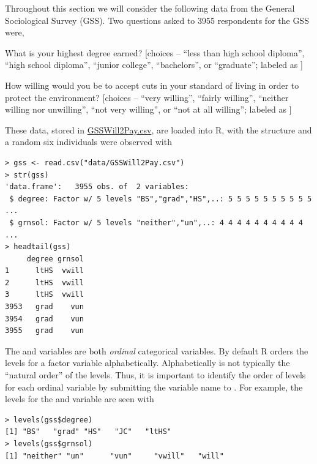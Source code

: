 \documentclass[10pt,openany]{book}\usepackage[]{graphicx}\usepackage[]{color}
\makeatletter
\newenvironment{kframe}{%
 \def\at@end@of@kframe{}%
 \ifinner\ifhmode%
  \def\at@end@of@kframe{\end{minipage}}%
  \begin{minipage}{\columnwidth}%
 \fi\fi%
 \def\FrameCommand##1{\hskip\@totalleftmargin \hskip-\fboxsep
 \colorbox{shadecolor}{##1}\hskip-\fboxsep
     \hskip-\linewidth \hskip-\@totalleftmargin \hskip\columnwidth}%
 \MakeFramed {\advance\hsize-\width
   \@totalleftmargin\z@ \linewidth\hsize
   \@setminipage}}%
 {\par\unskip\endMakeFramed%
 \at@end@of@kframe}
\newenvironment{knitrout}{}{} %
\makeatother
\begin{document}
Throughout this section we will consider the following data from the General Sociological Survey (GSS).  Two questions asked to 3955 respondents for the GSS were,
\begin{Itemize}
  \item What is your highest degree earned? [choices -- ``less than high school diploma'', ``high school diploma'', ``junior college'', ``bachelors'', or ``graduate''; labeled as ]
  \item How willing would you be to accept cuts in your standard of living in order to protect the environment? [choices -- ``very willing'', ``fairly willing'', ``neither willing nor unwilling'', ``not very willing'', or ``not at all willing''; labeled as ]
\end{Itemize}
These data, stored in \href{https://raw.githubusercontent.com/droglenc/NCData/master/GSSWill2Pay.csv}{GSSWill2Pay.csv}, are loaded into R, with the structure and a random six individuals were observed with
\begin{knitrout}
\color{fgcolor}\begin{kframe}
\begin{verbatim}
> gss <- read.csv("data/GSSWill2Pay.csv")
> str(gss)
'data.frame':	3955 obs. of  2 variables:
 $ degree: Factor w/ 5 levels "BS","grad","HS",..: 5 5 5 5 5 5 5 5 5 5 ...
 $ grnsol: Factor w/ 5 levels "neither","un",..: 4 4 4 4 4 4 4 4 4 4 ...
> headtail(gss)
     degree grnsol
1      ltHS  vwill
2      ltHS  vwill
3      ltHS  vwill
3953   grad    vun
3954   grad    vun
3955   grad    vun
\end{verbatim}
\end{kframe}
\end{knitrout}
The  and  variables are both \emph{ordinal} categorical variables.  By default R orders the levels for a factor variable alphabetically.  Alphabetically is not typically the ``natural order'' of the levels.  Thus, it is important to identify the order of levels for each ordinal variable by submitting the variable name to .  For example, the levels for the  and  variable are seen with
\begin{knitrout}
\color{fgcolor}\begin{kframe}
\begin{verbatim}
> levels(gss$degree)
[1] "BS"   "grad" "HS"   "JC"   "ltHS"
> levels(gss$grnsol)
[1] "neither" "un"      "vun"     "vwill"   "will"   
\end{verbatim}
\end{kframe}
\end{knitrout}
\end{document}
